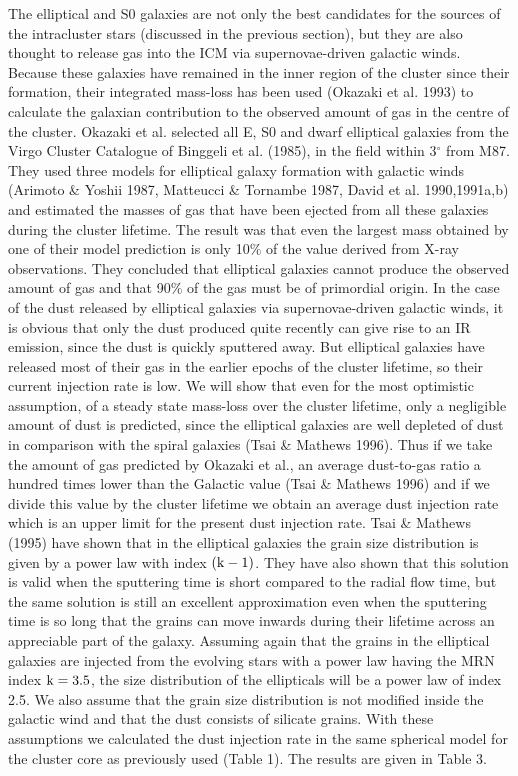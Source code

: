 \documentclass[]{aa}
\begin{document}
The elliptical and S0 galaxies are not only the best candidates for the 
sources of the intracluster stars (discussed in the previous section), but 
they are also thought to release gas  
into the ICM via supernovae-driven galactic winds. Because these
galaxies have remained in the inner region of the cluster since their
formation, their integrated mass-loss has been used 
(Okazaki et al. 1993) to calculate the galaxian contribution to the 
observed amount of gas in the centre of the cluster. Okazaki
et al. selected all E, S0 and dwarf elliptical galaxies from the Virgo Cluster
Catalogue of Binggeli et al. (1985), in the field within
3$^{\circ}$ from M87. They used three models for elliptical galaxy 
formation with galactic winds (Arimoto \& Yoshii 1987, Matteucci \& 
Tornambe 1987, David et al. 1990,1991a,b) and estimated the masses of 
gas that have been ejected from all these galaxies during the 
cluster lifetime. The result was that even the largest mass obtained by one 
of their model prediction is only 10$\%$ of the value derived from X-ray
observations. They
concluded that elliptical galaxies cannot produce the observed amount
of gas and that 90$\%$ of the gas must be of primordial origin. In the case of
the dust released by elliptical galaxies via supernovae-driven galactic
winds, it is obvious that only the dust produced quite recently
can give rise to an IR emission, since the dust is quickly sputtered
away. But elliptical galaxies have released most of their gas in the earlier
epochs of the cluster lifetime, so their current injection rate is low. We 
will show that even for the most optimistic assumption, of a steady state 
mass-loss over the cluster lifetime, only a
negligible amount of dust is predicted, since the elliptical galaxies are 
well depleted of dust
in comparison with the spiral galaxies (Tsai \& Mathews 1996). Thus if we 
take the amount of gas predicted by Okazaki et al., an average dust-to-gas 
ratio a hundred times lower than the Galactic value (Tsai \& Mathews 1996) 
and if we divide this value by the cluster lifetime we obtain an
average dust injection rate which is an upper limit for the present dust 
injection rate. Tsai \& Mathews (1995) have shown that in the elliptical 
galaxies the grain size distribution is given by a power law with index 
$({\rm k}-1)$. They have also shown that this solution
is valid when the sputtering time is short compared to the radial flow time,
but the same solution is still an excellent approximation even when the
sputtering time is so long that the grains can move inwards during their
lifetime across an appreciable part of the galaxy. Assuming again that the
grains in the elliptical galaxies are injected from the evolving stars with a
power law having the MRN index ${\rm k}=3.5$, the size distribution of the 
ellipticals
will be a power law of index 2.5. We also assume that the 
grain size distribution is not modified inside the 
galactic wind and that the dust consists of silicate
grains. With these assumptions we 
calculated the dust injection rate in the same spherical model for
the cluster core as previously used (Table 1).
The results are given in Table 3.
\end{document}
